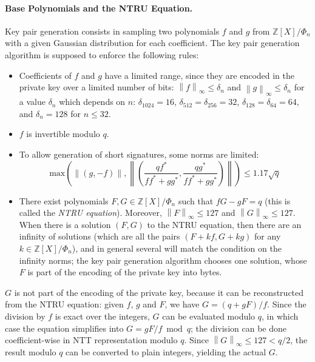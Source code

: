 \documentclass{llncs}
\newcommand{\bZ}{\mathbb{Z}}
\newcommand{\norm}[1]{\left\|#1\right\|}
\newcommand{\norminf}[1]{\norm{#1}_{\infty}}
\newcommand{\adj}[1]{{#1}^*}
\begin{document}
\paragraph{Base Polynomials and the NTRU Equation.}
Key pair generation consists in sampling two polynomials $f$ and $g$
from $\bZ[X]/\Phi_n$ with a given Gaussian distribution for each
coefficient. The key pair generation algorithm is supposed to enforce
the following rules:
\begin{itemize}

    \item Coefficients of $f$ and $g$ have a limited range, since they
    are encoded in the private key over a limited number of bits: $\norminf{f}
    \leq \delta_n$ and $\norminf{g} \leq \delta_n$ for a value
    $\delta_n$ which depends on $n$: $\delta_{1024} = 16$, $\delta_{512}
    = \delta_{256} = 32$, $\delta_{128} = \delta_{64} = 64$, and
    $\delta_n = 128$ for $n\leq 32$.

    \item $f$ is invertible modulo $q$.

    \item To allow generation of short signatures, some norms are limited:
    \begin{equation*}
        \text{max}\left(\norm{(g, -f)},
        \norm{\left(\frac{q\adj{f}}{f\adj{f} + g\adj{g}},
        \frac{q\adj{g}}{f\adj{f} + g\adj{g}}\right)} \right) \leq
        1.17\sqrt{q}
    \end{equation*}

    \item There exist polynomials $F, G\in\bZ[X]/\Phi_n$ such that $fG -
    gF = q$ (this is called the \emph{NTRU equation}). Moreover,
    $\norminf{F}\leq 127$ and $\norminf{G}\leq 127$. When there is a
    solution $(F, G)$ to the NTRU equation, then there are an infinity
    of solutions (which are all the pairs $(F + kf, G + kg)$ for any
    $k\in \bZ[X]/\Phi_n$), and in general several will match the
    condition on the infinity norms; the key pair generation algorithm
    chooses one solution, whose $F$ is part of the encoding of the
    private key into bytes.

\end{itemize}

$G$ is not part of the encoding of the private key, because it can be
reconstructed from the NTRU equation: given $f$, $g$ and $F$, we have
$G = (q + gF)/f$. Since the division by $f$ is exact over the integers,
$G$ can be evaluated modulo $q$, in which case the equation simplifies
into $G = gF/f \bmod q$; the division can be done coefficient-wise in
NTT representation modulo $q$. Since $\norminf{G} \leq 127 < q/2$, the
result modulo $q$ can be converted to plain integers, yielding the
actual $G$.
\end{document}
